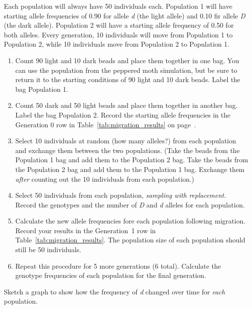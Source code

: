 \documentclass[12pt]{exam}
\newcommand{\allele}[1]{\textit{#1}}
\begin{document}
\begin{questions}
Each population will always have 50 individuals each. Population 1 will have starting allele frequencies of 0.90 for allele \allele{d} (the light allele) and 0.10 fir allele \allele{D} (the dark allele). Population 2 will have a starting allele frequency of 0.50 for both alleles. Every generation, 10 individuals will move from Population 1 to Population 2, while 10 individuals move from Population 2 to Population 1.


\begin{enumerate}

	\item Count 90 light and 10 dark beads and place them together in one bag. You can use the population from the peppered moth simulation, but be sure to return it to the starting conditions of 90 light and 10 dark beads. Label the bag Population 1.
	
	\item Count 50 dark and 50 light beads and place them together in another bag. Label the bag Population 2.  Record the starting allele frequencies in the Generation 0 row in Table~\ref{tab:migration_results} on page~\pageref{tab:migration_results}.
	
	\item Select 10 individuals at random (how many alleles?) from each population and exchange them between the two populations. (Take the beads from the Population 1 bag and add them to the Population 2 bag. Take the beads from the Population 2 bag and add them to the Population 1 bag. Exchange them \emph{after} counting out the 10 individuals from each population.)
	
	\item Select 50 individuals from each population, \emph{sampling with replacement.} Record the genotypes and the number of \allele{D} and \allele{d} alleles for each population.
	
	\item Calculate the new allele frequencies fore each population following migration. Record your results in the Generation~1 row in Table~\ref{tab:migration_results}. The population size of each population should still be 50 individuals.
	
	\item Repeat this procedure for 5 more generations (6 total). Calculate the genotype frequencies of each population for the final generation.

\end{enumerate}

\question
Sketch a graph to show how the frequency of \allele{d} changed over time for \emph{each} population.


\end{questions}
\end{document}
